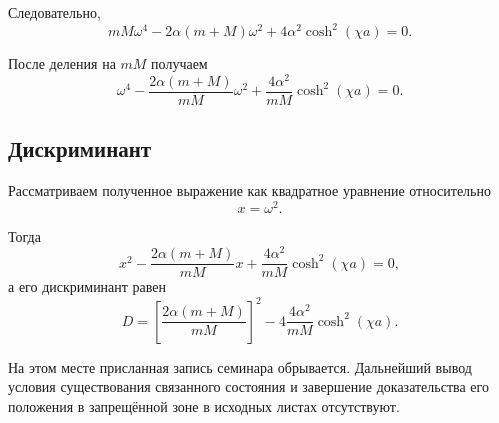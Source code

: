 \documentclass[../final.tex]{subfiles}
\begin{document}
Следовательно,
%
\begin{equation*}
    mM\omega^4
    -
    2\alpha(m+M)\omega^2
    +
    4\alpha^2
    \cosh^2(\chi a)
    =
    0.
\end{equation*}
%

После деления на $mM$ получаем
%
\begin{equation*}
    \omega^4
    -
    \frac{2\alpha(m+M)}{mM}
    \omega^2
    +
    \frac{4\alpha^2}{mM}
    \cosh^2(\chi a)
    =
    0.
\end{equation*}


\subsection*{Дискриминант}

Рассматриваем полученное выражение
как квадратное уравнение относительно
%
\begin{equation*}
    x=\omega^2.
\end{equation*}
%

Тогда
%
\begin{equation*}
    x^2
    -
    \frac{2\alpha(m+M)}{mM}x
    +
    \frac{4\alpha^2}{mM}
    \cosh^2(\chi a)
    =
    0,
\end{equation*}
%
а его дискриминант равен
%
\begin{equation*}
    D
    =
    \left[
        \frac{2\alpha(m+M)}{mM}
    \right]^2
    -
    4
    \frac{4\alpha^2}{mM}
    \cosh^2(\chi a).
\end{equation*}


На этом месте присланная запись семинара обрывается.
Дальнейший вывод условия существования связанного состояния
и завершение доказательства его положения
в запрещённой зоне в исходных листах отсутствуют.
\end{document}

